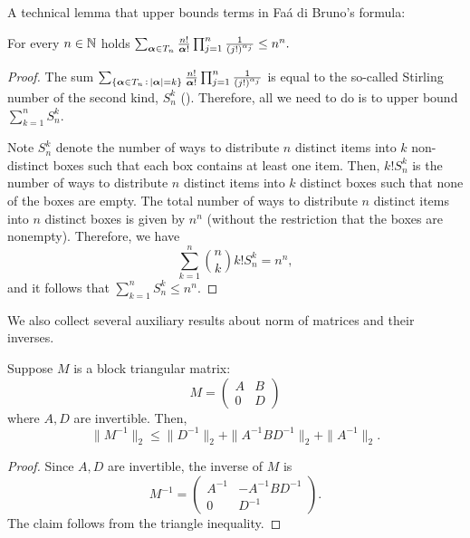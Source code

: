 




A technical lemma that upper bounds terms in Fa\'{a} di Bruno's formula:


\begin{lemma}\label{lemma:stirling}
For every $n\in\mathbb{N}$ holds $\sum_{{\boldsymbol \alpha}\in T_n}
  \frac{n!}{{\boldsymbol \alpha}!}\prod_{j=1}^n\frac{1}{(j!)^{\alpha_j}}\le n^n. $   
\end{lemma}
\begin{proof}
The sum
  $\sum_{\{{\boldsymbol \alpha}\in T_n\, :\,|{\boldsymbol \alpha}|=k \}}
  \frac{n!}{{\boldsymbol \alpha}!}\prod_{j=1}^n\frac{1}{(j!)^{\alpha_j}}$ is equal
  to the so-called Stirling number of the second kind, $S_n^k$ (\cite{FaadiBruno}). Therefore, all we need to do is to upper bound $\sum_{k=1}^nS_n^k$. 

Note $S_n^k$ denote the number of ways to distribute $n$ distinct items into $k$ non-distinct boxes such that each box contains at least one item. Then, $k!S_n^k$ is the number of ways to distribute $n$ distinct items into $k$ distinct boxes such that none of the boxes are empty. The total number of ways to distribute $n$ distinct items into $n$ distinct boxes is given by $n^n$ (without the restriction that the boxes are nonempty). Therefore, we have 
$$\sum_{k=1}^n{n\choose k}k! S_n^k = n^n,$$
and it follows that $\sum_{k=1}^nS_n^k \leq n^n$. 
\end{proof}




We also collect several auxiliary results about norm of matrices and their inverses. 
\begin{lemma}\label{lemma:blockTriangle}
Suppose $M$ is a block triangular matrix: \[
   M =
   \begin{pmatrix}
   A & B \\
   0 & D 
   \end{pmatrix}
\]
where $A, D$ are invertible. Then,
$$\|M^{-1}\|_2 %
\leq \|D^{-1}\|_2 + \|A^{-1}BD^{-1}\|_2 + \|A^{-1}\|_2.$$
\end{lemma}
\begin{proof}
  Since $A, D$ are invertible, the inverse of $M$ is
\begin{equation*}
  M^{-1} = %
                       \begin{pmatrix}
                        A^{-1} & -A^{-1}BD^{-1} \\
                        0 & D^{-1}
                        \end{pmatrix}.
\end{equation*}
The claim follows from the triangle inequality.
\end{proof}

